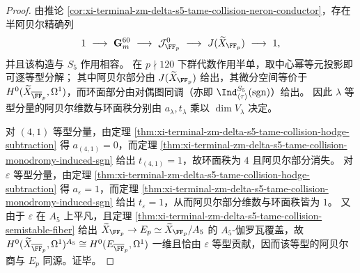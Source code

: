 \begin{proof}
由推论 \ref{cor:xi-terminal-zm-delta-s5-tame-collision-neron-conductor}，存在半阿贝尔精确列
\[
1\ \longrightarrow\ \mathbf G_m^{60}\ \longrightarrow\ \mathcal J^0_{\FF_p}\ \longrightarrow\ J(\widetilde X_{\FF_p})\ \longrightarrow\ 1,
\]
并且该构造与 \(S_5\) 作用相容。
在 \(p\nmid 120\) 下群代数作用半单，取中心幂等元投影即可逐等型分解；
其中阿贝尔部分由 \(J(\widetilde X_{\FF_p})\) 给出，其微分空间等价于 \(H^0(\widetilde X_{\overline{\FF}_p},\Omega^1)\)，而环面部分由对偶图同调（亦即 \(\Ind^{S_5}_{\langle\tau\rangle}(\mathrm{sgn})\)）给出。
因此 \(\lambda\) 等型分量的阿贝尔维数与环面秩分别由 \(a_\lambda,t_\lambda\) 乘以 \(\dim V_\lambda\) 决定。
\par
对 \((4,1)\) 等型分量，由定理 \ref{thm:xi-terminal-zm-delta-s5-tame-collision-hodge-subtraction} 得 \(a_{(4,1)}=0\)，而定理 \ref{thm:xi-terminal-zm-delta-s5-tame-collision-monodromy-induced-sgn} 给出 \(t_{(4,1)}=1\)，故环面秩为 \(4\) 且阿贝尔部分消失。
对 \(\varepsilon\) 等型分量，由定理 \ref{thm:xi-terminal-zm-delta-s5-tame-collision-hodge-subtraction} 得 \(a_\varepsilon=1\)，而定理 \ref{thm:xi-terminal-zm-delta-s5-tame-collision-monodromy-induced-sgn} 给出 \(t_\varepsilon=1\)，从而阿贝尔部分维数与环面秩皆为 \(1\)。
又由于 \(\varepsilon\) 在 \(A_5\) 上平凡，且定理 \ref{thm:xi-terminal-zm-delta-s5-tame-collision-semistable-fiber} 给出 \(\widetilde X_{\FF_p}\to E_p\simeq \widetilde X_{\FF_p}/A_5\) 的 \(A_5\)-伽罗瓦覆盖，故
\(
H^0(\widetilde X_{\overline{\FF}_p},\Omega^1)^{A_5}\cong H^0(E_{\overline{\FF}_p},\Omega^1)
\)
一维且恰由 \(\varepsilon\) 等型贡献，因而该等型的阿贝尔商与 \(E_p\) 同源。证毕。
\end{proof}

